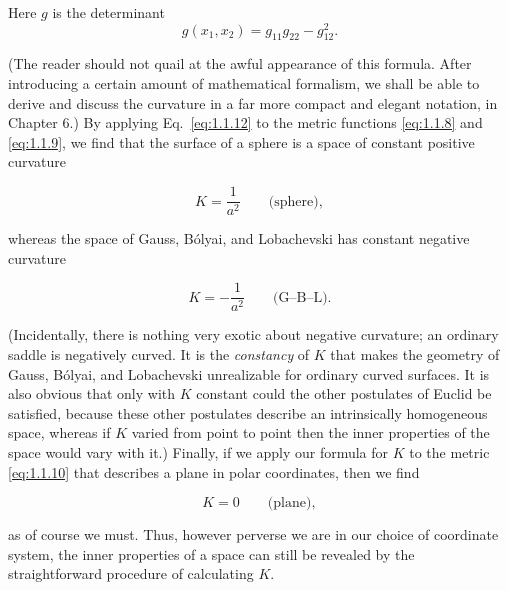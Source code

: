 Here \(g\) is the determinant
\[
  g(x_1,x_2)=g_{11}g_{22}-g_{12}^2.
\]

(The reader should not quail at the awful appearance of this formula. After
introducing a certain amount of mathematical formalism, we shall be able to
derive and discuss the curvature in a far more compact and elegant notation,
in Chapter 6.) By applying Eq.~\eqref{eq:1.1.12} to the metric functions
\eqref{eq:1.1.8} and \eqref{eq:1.1.9}, we find that the surface of a sphere is
a space of constant positive curvature

\begin{equation}
  K=\frac{1}{a^2}\qquad\text{(sphere)},
  \tag{1.1.13}\label{eq:1.1.13}
\end{equation}

whereas the space of Gauss, B\'olyai, and Lobachevski has constant negative
curvature

\begin{equation}
  K=-\frac{1}{a^2}\qquad\text{(G--B--L)}.
  \tag{1.1.14}\label{eq:1.1.14}
\end{equation}

(Incidentally, there is nothing very exotic about negative curvature; an
ordinary saddle is negatively curved. It is the \emph{constancy} of \(K\)
that makes the geometry of Gauss, B\'olyai, and Lobachevski unrealizable for
ordinary curved surfaces. It is also obvious that only with \(K\) constant
could the other postulates of Euclid be satisfied, because these other
postulates describe an intrinsically homogeneous space, whereas if \(K\)
varied from point to point then the inner properties of the space would vary
with it.) Finally, if we apply our formula for \(K\) to the metric
\eqref{eq:1.1.10} that describes a plane in polar coordinates, then we find

\begin{equation}
  K=0\qquad\text{(plane)},
  \tag{1.1.15}\label{eq:1.1.15}
\end{equation}

as of course we must. Thus, however perverse we are in our choice of coordinate
system, the inner properties of a space can still be revealed by the
straightforward procedure of calculating \(K\).

